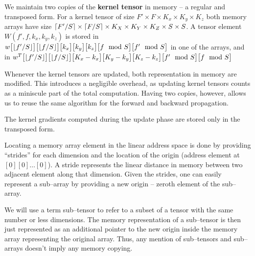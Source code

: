   We maintain two copies of the {\bf kernel tensor} in memory -- a
  regular and transposed form.  For a kernel tensor of size $F' \times
  F \times K_x \times K_y \times K_z$ both memory arrays have size
  $\lceil F'/S\rceil \times \lceil F/S\rceil \times K_X \times K_Y \times K_Z
  \times S \times S$.  A tensor element $W(f',f,k_x,k_y,k_z)$ is
  stored in $w\big[\lfloor f'/S\rfloor\big]
  \big[\lfloor f/S\rfloor\big]\big[k_x\big]\big[k_y\big]\big[k_z\big]\big[f\mod S\big]\big[f'
    \mod S\big]$ in one of the arrays, and in $w^T\big[\lfloor f'/S\rfloor\big]
  \big[\lfloor f/S\rfloor\big]\big[K_x-k_x\big]\big[K_y-k_y\big]\big[K_z-k_z\big]\big[f'\mod
    S\big]\big[f\mod S\big]$

  Whenever the kernel tensors are updated, both representation in
  memory are modified.  This introduces a negligible overhead, as
  updating kernel tensors counts as a miniscule part of the total
  computation.  Having two copies, however, allows us to reuse the
  same algorithm for the forward and backward propagation.

  The kernel gradients computed during the update phase are stored
  only in the transposed form.

  Locating a memory array element in the linear address space is done
  by providing ``strides'' for each dimension and the location of the
  origin (address element at $[0][0]\dots[0]$).  A stride represents
  the linear distance in memory between two adjacent element along
  that dimension.  Given the strides, one can easily represent a
  sub--array by providing a new origin -- zeroth element of the
  sub--array.

  We will use a term sub--tensor to refer to a subset of a tensor with
  the same number or less dimensions.  The memory representation of a
  sub--tensor is then just represented as an additional pointer to the
  new origin inside the memory array representing the original array.
  Thus, any mention of sub--tensors and sub--arrays doesn't imply any
  memory copying.
